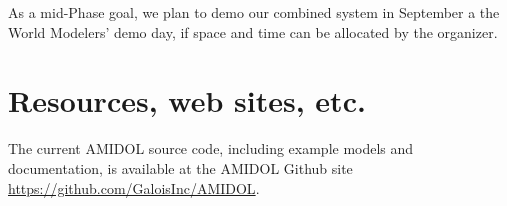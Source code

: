 \documentclass[11pt]{article}
\newcommand{\amidol}{\textsc{AMIDOL}}
\begin{document}
As a mid-Phase goal, we plan to demo our combined system in September
a the World Modelers' demo day, if space and time can be allocated by
the organizer.

\section{Resources, web sites, etc.}

The current \amidol{} source code, including example models and documentation, is available at the \amidol{} Github site \url{https://github.com/GaloisInc/AMIDOL}.


\end{document}
